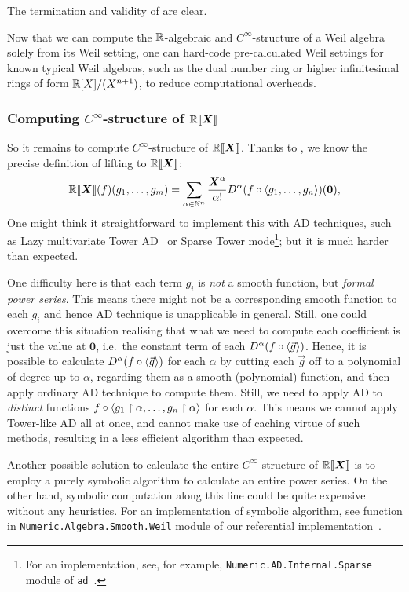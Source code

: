 \documentclass[%
  sigconf,authorversion,screen]{acmart}
\begin{document}
The termination and validity of  are clear.

Now that we can compute the $\mathbb{R}$-algebraic and $C^\infty$-structure of a Weil algebra solely from its Weil setting, one can hard-code pre-calculated Weil settings for known typical Weil algebras, such as the dual number ring or higher infinitesimal rings of form $\mathbb{R}[X]/(X^{n+1})$, to reduce computational overheads.

\subsubsection{Computing $C^\infty$-structure of $\mathord{\mathbb{R}\llbracket\boldsymbol{X}\rrbracket}$}\label{sec:power-series-lifting}
So it remains to compute $C^\infty$-structure of $\mathord{\mathbb{R}\llbracket\boldsymbol{X}\rrbracket}$.
Thanks to , we know the precise definition of lifting to $\mathord{\mathbb{R}\llbracket\boldsymbol{X}\rrbracket}$:
\[
  \mathord{\mathbb{R}\llbracket\boldsymbol{X}\rrbracket}(f)(g_1, \dots, g_m) = \sum_{\alpha \in \mathbb{N}^n} \frac{\boldsymbol{X}^\alpha}{\alpha!} D^\alpha(f \circ \braket{g_1, \dots, g_n})(\boldsymbol{0}),
\]
One might think it straightforward to implement this with AD techniques, such as Lazy multivariate Tower AD~\cite{Pearlmutter:2007aa} or Sparse Tower mode\footnote{For an implementation, see, for example, \texttt{Numeric.AD.Internal.Sparse} module of \texttt{ad}~\cite{Kmett:2010aa}.}; but it is much harder than expected.

One difficulty here is that each term $g_i$ is \emph{not} a smooth function, but \emph{formal power series}.
This means there might not be a corresponding smooth function to each $g_i$ and hence AD technique is unapplicable in general.
Still, one could overcome this situation realising that what we need to compute each coefficient is just the value at $\boldsymbol{0}$, i.e.\ the constant term of each $D^\alpha(f\circ\braket{\vec{g}})$.
Hence, it is possible to calculate $D^\alpha(f\circ\braket{\vec{g}})$ for each $\alpha$ by cutting each $\vec{g}$ off to a polynomial of degree up to $\alpha$, regarding them as a smooth (polynomial) function, and then apply ordinary AD technique to compute them.
Still, we need to apply AD to \emph{distinct} functions $f \circ \braket{g_1 \upharpoonright \alpha, \dots, g_n \upharpoonright \alpha}$ for each $\alpha$.
This means we cannot apply Tower-like AD all at once, and cannot make use of caching virtue of such methods, resulting in a less efficient algorithm than expected.

Another possible solution to calculate the entire $C^\infty$-structure of $\mathord{\mathbb{R}\llbracket\boldsymbol{X}\rrbracket}$ is to employ a purely symbolic algorithm to calculate an entire power series.
On the other hand, symbolic computation along this line could be quite expensive without any heuristics.
For an implementation of symbolic algorithm, see  function in \texttt{Numeric.Algebra.Smooth.Weil} module of our referential implementation~\cite{Ishii:2020aa}.
\end{document}

